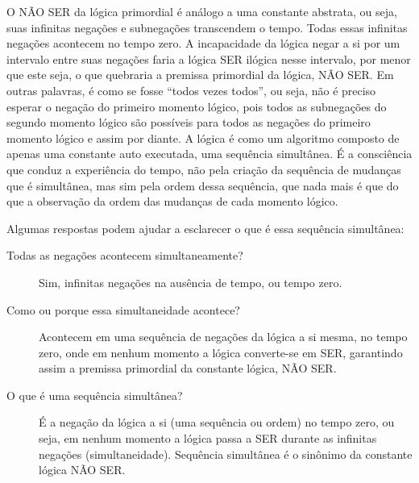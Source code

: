 O NÃO SER da lógica primordial é análogo a uma constante abstrata, ou seja, suas infinitas negações e subnegações transcendem o tempo. Todas essas infinitas negações acontecem no tempo zero. A incapacidade da lógica negar a si por um intervalo entre suas negações faria a lógica SER ilógica nesse intervalo, por menor que este seja, o que quebraria a premissa primordial da lógica, NÃO SER. Em outras palavras, é como se fosse “todos vezes todos”, ou seja, não é preciso esperar o negação do primeiro momento lógico, pois todos as subnegações do segundo momento lógico são possíveis para todos as negações do primeiro momento lógico e assim por diante. A lógica é como um algoritmo composto de apenas uma constante auto executada, uma sequência simultânea. É a consciência que conduz a experiência do tempo, não pela criação da sequência de mudanças que é simultânea, mas sim pela ordem dessa sequência, que nada mais é que do que a observação da ordem das mudanças de cada momento lógico.

Algumas respostas podem ajudar a esclarecer o que é essa sequência simultânea:
	\begin{description}
	   \item[Todas as negações acontecem simultaneamente?] Sim, infinitas negações na ausência de tempo, ou tempo zero.
	   \item[Como ou porque essa simultaneidade acontece?] Acontecem em uma sequência de negações da lógica a si mesma, no tempo zero, onde em nenhum momento a lógica converte-se em SER, garantindo assim a premissa primordial da constante lógica, NÃO SER.
	   \item[O que é uma sequência simultânea?] É a negação da lógica a si (uma sequência ou ordem) no tempo zero, ou seja, em nenhum momento a lógica passa a SER durante as infinitas negações (simultaneidade). Sequência simultânea é o sinônimo da constante lógica NÃO SER.
	\end{description}